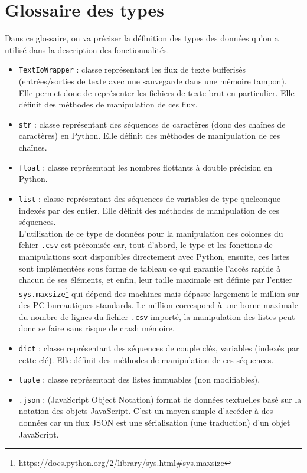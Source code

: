 	\section{Glossaire des types}
		Dans ce glossaire, on va préciser la définition des types des données qu'on a utilisé dans la description des fonctionnalités.
		\begin{itemize}
			\item \lstinline!TextIoWrapper! : classe représentant les flux de texte bufferisés (entrées/sorties de texte avec une sauvegarde dans une mémoire tampon). Elle permet donc de représenter les fichiers de texte brut en particulier. Elle définit des méthodes de manipulation de ces flux.
			\item \lstinline!str! : classe représentant des séquences de caractères (donc des chaînes de caractères) en Python. Elle définit des méthodes de manipulation de ces chaînes.
			\item \lstinline!float! : classe représentant les nombres flottants à double précision en Python.
			\item \lstinline!list! : classe représentant des séquences de variables de type quelconque indexés par des entier. Elle définit des méthodes de manipulation de ces séquences.\\
				L'utilisation de ce type de données pour la manipulation des colonnes du fchier \lstinline!.csv! est préconisée car, tout d'abord, le type et les fonctions de manipulations sont disponibles directement avec Python, ensuite, ces listes sont implémentées sous forme de tableau ce qui garantie l'accès rapide à chacun de ses éléments, et enfin, leur taille maximale est définie par l'entier \lstinline!sys.maxsize!\footnote{https://docs.python.org/2/library/sys.html#sys.maxsize} qui dépend des machines mais dépasse largement le million sur des PC bureautiques standards. Le million correspond à une borne maximale du nombre de lignes du fichier \lstinline!.csv! importé, la manipulation des listes peut donc se faire sans risque de crash mémoire.
			\item \lstinline!dict! : classe représentant des séquences de couple clés, variables (indexés par cette clé). Elle définit des méthodes de manipulation de ces séquences.		
			\item \lstinline!tuple! : classe représentant des listes immuables (non modifiables).
			\item \lstinline!.json! : (JavaScript Object Notation) format de données textuelles basé sur la notation des objets JavaScript. C'est un moyen simple d'accéder à des données car un flux JSON est une sérialisation (une traduction) d'un objet JavaScript.

\end{itemize}
